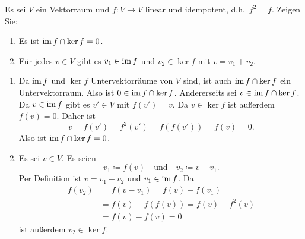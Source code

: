 \begin{question}
 Es sei $V$ ein Vektorraum und $f \colon V \to V$ linear und idempotent, d.h.\ $f^2 = f$. Zeigen Sie:
 \begin{enumerate}
  \item
   Es ist $\operatorname{im} f \cap \ker f = 0$.
  \item
   Für jedes $v \in V$ gibt es $v_1 \in \operatorname{im} f$ und $v_2 \in \ker f$ mit $v = v_1 + v_2$.
 \end{enumerate}
\end{question}
\begin{solution}
 \begin{enumerate}
  \item
   Da $\operatorname{im} f$ und $\ker f$ Untervektorräume von $V$ sind, ist auch $\operatorname{im} f \cap \ker f$ ein Untervektorraum. Also ist $0 \in \operatorname{im} f \cap \ker f$. Andererseits sei $v \in \operatorname{im} f \cap \ker f$. Da $v \in \operatorname{im} f$ gibt es $v' \in V$ mit $f(v') = v$. Da $v \in \ker f$ ist außerdem $f(v) = 0$. Daher ist
   \[
    v = f(v') = f^2(v') = f(f(v')) = f(v) = 0.
   \]
   Also ist $\operatorname{im} f \cap \ker f = 0$.
  \item
   Es sei $v \in V$. Es seien
   \[
    v_1 \coloneqq f(v) \quad \text{und} \quad v_2 \coloneqq v - v_1.
   \]
   Per Definition ist $v = v_1 + v_2$ und $v_1 \in \operatorname{im} f$. Da
   \begin{align*}
    f(v_2) &= f(v - v_1) = f(v) - f(v_1) \\
           &= f(v) - f(f(v)) = f(v) - f^2(v) \\
           &= f(v) - f(v) = 0
   \end{align*}
   ist außerdem $v_2 \in \ker f$.
 \end{enumerate}
\end{solution}


